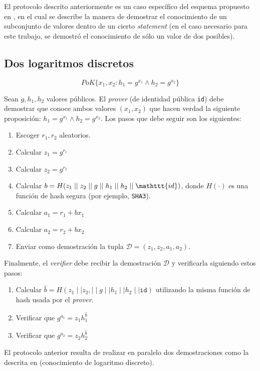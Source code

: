 El protocolo descrito anteriormente es un caso específico del esquema propuesto en \cite{cramer1994proofs}, en el cual se describe la manera de demostrar el conocimiento de un subconjunto de valores dentro de un cierto \emph{statement} (en el caso necesario para este trabajo, se demostró el conocimiento de sólo un valor de dos posibles). 

\subsection{Dos logaritmos discretos}

$$PoK\{x_1, x_2 : h_1 = g^{x_1} \land h_2 = g^{x_2}\}$$

Sean $g,h_1,h_2$ valores públicos. El \emph{prover} (de identidad pública 
\texttt{id}) debe demostrar que conoce ambos valores $(x_1,x_2)$ que hacen 
verdad la siguiente proposición: $h_1 = g^{x_1} \land h_2 = g^{x_2}$. Los 
pasos que debe seguir son los siguientes:
\begin{enumerate}
	\item Escoger $r_1, r_2$ aleatorios.
	\item Calcular $z_1 = g^{r_1} $
	\item Calcular $z_2 = g^{r_2}$
	\item Calcular $b = H(z_1 \mid\mid z_2 \mid\mid g \mid\mid h_1 \mid\mid h_2 \mid\mid \mathttt{id})$, donde $H(\cdot)$ es una función de hash segura (por ejemplo, \texttt{SHA3}).
	\item Calcular $a_1 = r_1 + b x_1$
	\item Calcular $a_2 = r_2 + b x_2$
	\item Enviar como demostración la tupla $\mathcal{D} = (z_1, z_2, a_1, a_2)$.
\end{enumerate}

Finalmente, el \emph{verifier} debe recibir la demostración $\mathcal{D}$ y verificarla siguiendo estos pasos:
\begin{enumerate}
	\item Calcular $\hat{b} = H(z_1 \mid\mid z_2, \mid\mid g \mid\mid h_1 \mid\mid h_2 \mid\mid \mathtt{id})$ utilizando la misma función de hash usada por el \emph{prover}.
	\item Verificar que $g^{a_1} = z_1 h_1^\hat{b}$
	\item Verificar que $g^{a_2} = z_2 h_2^\hat{b}$
\end{enumerate}

El protocolo anterior resulta de realizar en paralelo dos demostraciones como la descrita en \cite{schnorr1989efficient} (conocimiento de logaritmo discreto).


